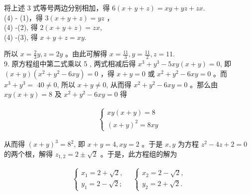 \documentclass[10pt]{article}
\begin{document}
将上述 3 式等号两边分别相加，得 $6(x+y+z)=x y+y z+z x$.\\
(4) - (1)，得 $3(x+y+z)=y z$ ，\\
(4) -(2), 得 $2(x+y+z)=z x$,\\
(4) -(3), 得 $x+y+z=x y$.

所以 $x=\frac{2}{3} y, z=2 y$ 。由此可解得 $x=\frac{11}{3}, y=\frac{11}{2}, z=11$.\\
9. 原方程组中第二式乘以 5 , 两式相减后得 $x^{3}+y^{3}-5 x y(x+y)=0$, 即 $(x+y)\left(x^{2}+y^{2}-6 x y\right)=0$ ，得 $x+y=0$ 或 $x^{2}+y^{2}-6 x y=0$ 。而 $x^{3}+y^{3}=$ $40 \neq 0$, 所以 $x+y \neq 0$, 从而得 $x^{2}+y^{2}-6 x y=0$ 。那么由 $x y(x+y)=8$ 及 $x^{2}+y^{2}-6 x y=0$ 得

\begin{align*}
\left\{\begin{array}{l}
x y(x+y)=8 \\
(x+y)^{2}=8 x y
\end{array}\right.
\end{align*}

从而得 $(x+y)^{3}=8^{2}$, 即 $x+y=4, x y=2$ 。于是 $x, y$ 为方程 $z^{2}-4 z+2=0$ 的两个根，解得 $z_{1,2}=2 \pm \sqrt{2}$ 。于是，此方程组的解为

\begin{align*}
\left\{\begin{array} { l } 
{ x _ { 1 } = 2 + \sqrt { 2 } , } \\
{ y _ { 1 } = 2 - \sqrt { 2 } ; }
\end{array} \quad \left\{\begin{array}{l}
x_{2}=2-\sqrt{2}, \\
y_{2}=2+\sqrt{2} .
\end{array}\right.\right.
\end{align*}
\end{document}
